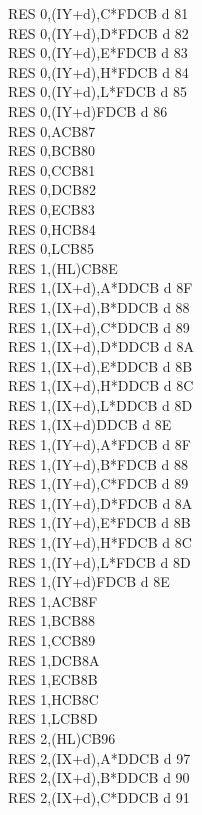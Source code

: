\documentclass[oneside,a4paper]{book}
\begin{document}
\begin{multicols}{3}
{\begin{tabbing}
RES 0,(IY+d),C*\>FDCB d 81\\
RES 0,(IY+d),D*\>FDCB d 82\\
RES 0,(IY+d),E*\>FDCB d 83\\
RES 0,(IY+d),H*\>FDCB d 84\\
RES 0,(IY+d),L*\>FDCB d 85\\
RES 0,(IY+d)\>FDCB d 86\\
RES 0,A\>CB87\\
RES 0,B\>CB80\\
RES 0,C\>CB81\\
RES 0,D\>CB82\\
RES 0,E\>CB83\\
RES 0,H\>CB84\\
RES 0,L\>CB85\\
RES 1,(HL)\>CB8E\\
RES 1,(IX+d),A*\>DDCB d 8F\\
RES 1,(IX+d),B*\>DDCB d 88\\
RES 1,(IX+d),C*\>DDCB d 89\\
RES 1,(IX+d),D*\>DDCB d 8A\\
RES 1,(IX+d),E*\>DDCB d 8B\\
RES 1,(IX+d),H*\>DDCB d 8C\\
RES 1,(IX+d),L*\>DDCB d 8D\\
RES 1,(IX+d)\>DDCB d 8E\\
RES 1,(IY+d),A*\>FDCB d 8F\\
RES 1,(IY+d),B*\>FDCB d 88\\
RES 1,(IY+d),C*\>FDCB d 89\\
RES 1,(IY+d),D*\>FDCB d 8A\\
RES 1,(IY+d),E*\>FDCB d 8B\\
RES 1,(IY+d),H*\>FDCB d 8C\\
RES 1,(IY+d),L*\>FDCB d 8D\\
RES 1,(IY+d)\>FDCB d 8E\\
RES 1,A\>CB8F\\
RES 1,B\>CB88\\
RES 1,C\>CB89\\
RES 1,D\>CB8A\\
RES 1,E\>CB8B\\
RES 1,H\>CB8C\\
RES 1,L\>CB8D\\
RES 2,(HL)\>CB96\\
RES 2,(IX+d),A*\>DDCB d 97\\
RES 2,(IX+d),B*\>DDCB d 90\\
RES 2,(IX+d),C*\>DDCB d 91\\

\end{tabbing}}
\end{multicols}
\end{document}
